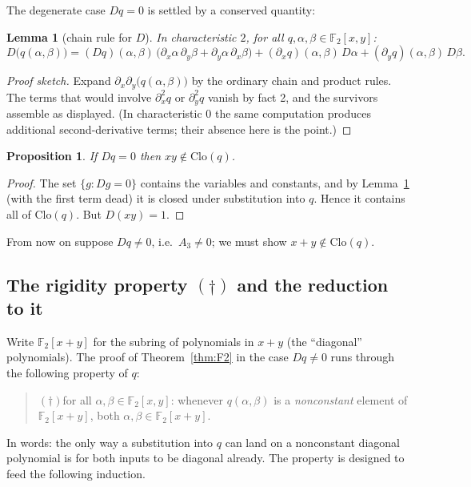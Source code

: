 \documentclass[11pt]{article}
\newtheorem{lemma}[theorem]{Lemma}
\newtheorem{proposition}[theorem]{Proposition}
\theoremstyle{definition}
\theoremstyle{remark}
\newcommand{\F}{\mathbb{F}}
\newcommand{\Clo}{\mathrm{Clo}}
\begin{document}
The degenerate case $Dq = 0$ is settled by a conserved quantity:

\begin{lemma}[chain rule for $D$]\label{lem:cocycle}
In characteristic $2$, for all $q, \alpha, \beta \in \F_2[x,y]$:
\[
  D\bigl(q(\alpha,\beta)\bigr)
  = (Dq)(\alpha,\beta)\,
      \bigl(\partial_x\alpha\,\partial_y\beta
            + \partial_y\alpha\,\partial_x\beta\bigr)
  + (\partial_x q)(\alpha,\beta)\, D\alpha
  + (\partial_y q)(\alpha,\beta)\, D\beta .
\]
\end{lemma}

\begin{proof}[Proof sketch]
Expand $\partial_x\partial_y\bigl(q(\alpha,\beta)\bigr)$ by the
ordinary chain and product rules.  The terms that would involve
$\partial_x^2 q$ or $\partial_y^2 q$ vanish by fact 2, and the
survivors assemble as displayed.  (In characteristic $0$ the same
computation produces additional second-derivative terms; their absence
here is the point.)
\end{proof}

\begin{proposition}\label{prop:Dzero}
If $Dq = 0$ then $xy \notin \Clo(q)$.
\end{proposition}

\begin{proof}
The set $\{g : Dg = 0\}$ contains the variables and constants, and by
Lemma~\ref{lem:cocycle} (with the first term dead) it is closed under
substitution into $q$.  Hence it contains all of $\Clo(q)$.  But
$D(xy) = 1$.
\end{proof}

From now on suppose $Dq \neq 0$, i.e.\ $A_3 \neq 0$; we must show
$x + y \notin \Clo(q)$.

\subsection{The rigidity property $(\dagger)$ and the reduction to
it}\label{sec:tameness}

Write $\F_2[x{+}y]$ for the subring of polynomials in $x+y$ (the
``diagonal'' polynomials).  The proof of Theorem~\ref{thm:F2} in the
case $Dq \neq 0$ runs through the following property of $q$:
\begin{quote}
  $(\dagger)$\quad for all $\alpha, \beta \in \F_2[x,y]$: whenever
  $q(\alpha,\beta)$ is a \emph{nonconstant} element of
  $\F_2[x{+}y]$, both $\alpha, \beta \in \F_2[x{+}y]$.
\end{quote}
In words: the only way a substitution into $q$ can land on a
nonconstant diagonal polynomial is for both inputs to be diagonal
already.  The property is designed to feed the following induction.
\end{document}
